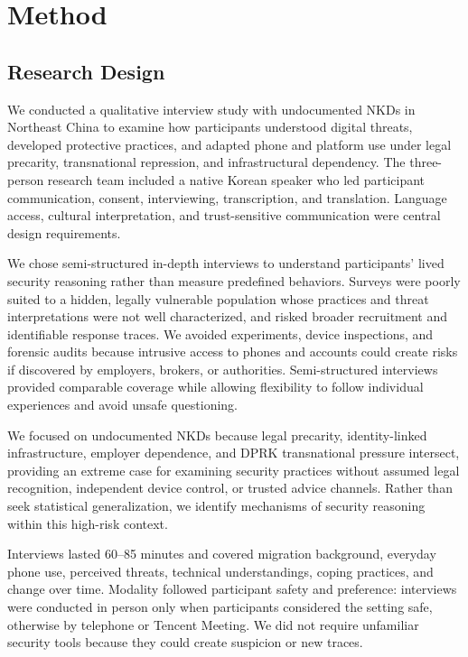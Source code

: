 \documentclass[conference,compsoc]{IEEEtran}
\begin{document}
\section{Method}

\subsection{Research Design}

We conducted a qualitative interview study with undocumented NKDs in Northeast China to examine how participants understood digital threats, developed protective practices, and adapted phone and platform use under legal precarity, transnational repression, and infrastructural dependency. The three-person research team included a native Korean speaker who led participant communication, consent, interviewing, transcription, and translation. Language access, cultural interpretation, and trust-sensitive communication were central design requirements.

We chose semi-structured in-depth interviews to understand participants' lived security reasoning rather than measure predefined behaviors. Surveys were poorly suited to a hidden, legally vulnerable population whose practices and threat interpretations were not well characterized, and risked broader recruitment and identifiable response traces. We avoided experiments, device inspections, and forensic audits because intrusive access to phones and accounts could create risks if discovered by employers, brokers, or authorities. Semi-structured interviews provided comparable coverage while allowing flexibility to follow individual experiences and avoid unsafe questioning.

We focused on undocumented NKDs because legal precarity, identity-linked infrastructure, employer dependence, and DPRK transnational pressure intersect, providing an extreme case for examining security practices without assumed legal recognition, independent device control, or trusted advice channels. Rather than seek statistical generalization, we identify mechanisms of security reasoning within this high-risk context.

Interviews lasted 60–85 minutes and covered migration background, everyday phone use, perceived threats, technical understandings, coping practices, and change over time. Modality followed participant safety and preference: interviews were conducted in person only when participants considered the setting safe, otherwise by telephone or Tencent Meeting. We did not require unfamiliar security tools because they could create suspicion or new traces.
\end{document}
